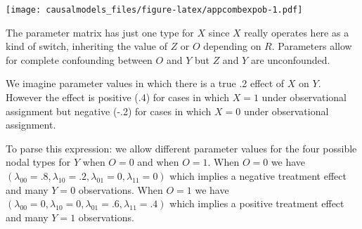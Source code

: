 \documentclass[
  12pt,
]{book}
\newenvironment{Shaded}{\begin{snugshade}}{\end{snugshade}}
\newcommand{\DataTypeTok}[1]{\textcolor[rgb]{0.13,0.29,0.53}{#1}}
\newcommand{\DecValTok}[1]{\textcolor[rgb]{0.00,0.00,0.81}{#1}}
\newcommand{\FloatTok}[1]{\textcolor[rgb]{0.00,0.00,0.81}{#1}}
\newcommand{\KeywordTok}[1]{\textcolor[rgb]{0.13,0.29,0.53}{\textbf{#1}}}
\newcommand{\NormalTok}[1]{#1}
\newcommand{\OperatorTok}[1]{\textcolor[rgb]{0.81,0.36,0.00}{\textbf{#1}}}
\newcommand{\StringTok}[1]{\textcolor[rgb]{0.31,0.60,0.02}{#1}}
\begin{document}
\begin{Shaded}
\end{Shaded}

\texttt{[image: causalmodels\_files/figure-latex/appcombexpob-1.pdf]}

The parameter matrix has just one type for \(X\) since \(X\) really operates here as a kind of switch, inheriting the value of \(Z\) or \(O\) depending on \(R\). Parameters allow for complete confounding between \(O\) and \(Y\) but \(Z\) and \(Y\) are unconfounded.

We imagine parameter values in which there is a true .2 effect of \(X\) on \(Y\). However the effect is positive (.4) for cases in which \(X=1\) under observational assignment but negative (-.2) for cases in which \(X=0\) under observational assignment.

\begin{Shaded}
\end{Shaded}

To parse this expression: we allow different parameter values for the four possible nodal types for \(Y\) when \(O=0\) and when \(O=1\). When \(O=0\) we have \((\lambda_{00} = .8, \lambda_{10} = .2, \lambda_{01} = 0, \lambda_{11} = 0)\) which implies a negative treatment effect and many \(Y=0\) observations. When \(O=1\) we have \((\lambda_{00} = 0, \lambda_{10} = 0, \lambda_{01} = .6, \lambda_{11} = .4)\) which implies a positive treatment effect and many \(Y=1\) observations.
\end{document}
